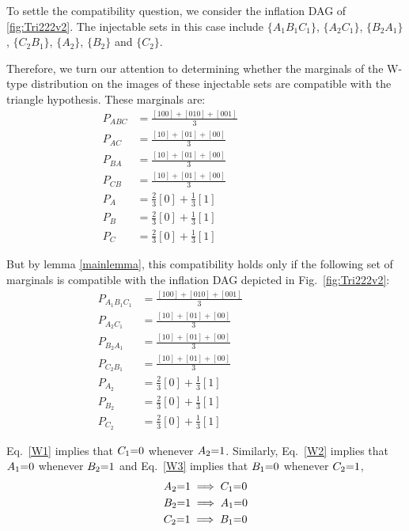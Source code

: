 To settle the compatibility question, we consider the inflation DAG of \cref{fig:Tri222v2}.  The injectable sets in this case include $\{A_1 B_1 C_1\}$, $\{A_2 C_1\}$, $\{B_2 A_1\}$, $\{C_2 B_1\}$,  $\{A_2\}$, $\{B_2\}$ and $\{C_2\}$. 

Therefore, we turn our attention to determining whether the marginals of the W-type distribution on the images of these injectable sets are compatible with the triangle hypothesis.  These marginals are:
\begin{align}
P_{A B C}&= \frac{[100]+[010]+[001]}{3} &&&&&&&&\label{V4}\\
P_{A C}&= \frac{[10]+[01]+[00]}{3} &&&&&&&&\label{V1}\\
P_{B A}&=\frac{[10]+[01]+[00]}{3} &&&&&&&&\label{V2}\\
P_{C B}&= \frac{[10]+[01]+[00]}{3} &&&&&&&&\label{V3}\\
P_{A}&= \frac{2}{3}[0] + \frac{1}{3}[1] &&&&&&&&\label{V5}\\
P_{B}&=\frac{2}{3}[0] + \frac{1}{3}[1]  &&&&&&&&\label{V6}\\
P_{C}&= \frac{2}{3}[0] + \frac{1}{3}[1]  &&&&&&&&\label{V7}
\end{align}

But by lemma \ref{mainlemma}, this compatibility holds only if the following set of marginals is compatible with the inflation DAG depicted in Fig.~\ref{fig:Tri222v2}:
\begin{align}
P_{A_1 B_1 C_1}&= \frac{[100]+[010]+[001]}{3} &&&&&&&&\label{W4}\\
P_{A_2 C_1}&= \frac{[10]+[01]+[00]}{3} &&&&&&&&\label{W1}\\
P_{B_2 A_1}&=\frac{[10]+[01]+[00]}{3} &&&&&&&&\label{W2}\\
P_{C_2 B_1}&= \frac{[10]+[01]+[00]}{3} &&&&&&&&\label{W3}\\
P_{A_2}&= \frac{2}{3}[0] + \frac{1}{3}[1] &&&&&&&&\label{W5}\\
P_{B_2}&=\frac{2}{3}[0] + \frac{1}{3}[1]  &&&&&&&&\label{W6}\\
P_{C_2}&= \frac{2}{3}[0] + \frac{1}{3}[1]  &&&&&&&&\label{W7}
\end{align}

Eq.~\eqref{W1} %
implies that $C_1\mathord{=} 0$ whenever $A_2 \mathord{=} 1$. Similarly, Eq.~\eqref{W2} implies that $A_1\mathord{=} 0$ whenever $B_2\mathord{=} 1$ and Eq.~\eqref{W3} implies that $B_1\mathord{=} 0$ whenever $C_2\mathord{=} 1$, 
\begin{align} 
&A_2 \mathord{=} 1 \implies C_1\mathord{=} 0\label{Ws1}\\
&B_2\mathord{=} 1 \implies A_1\mathord{=} 0\label{Ws2}\\
&C_2 \mathord{=} 1 \implies B_1 \mathord{=} 0\label{Ws3}
\end{align}

